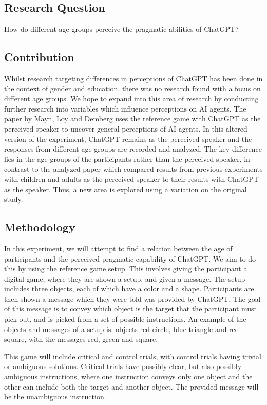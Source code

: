 \documentclass[12pt]{article}
\begin{document}
\subsection{Research Question}
How do different age groups perceive the pragmatic abilities of ChatGPT?


\subsection{Contribution}
Whilst research targeting differences in perceptions of ChatGPT has been done in the context of gender and education, there was no research found with a focus on different age groups. We hope to expand into this area of research by conducting further research into variables which influence perceptions on AI agents. 
The paper by Mayn, Loy and Demberg uses the reference game with ChatGPT as the perceived speaker to uncover general perceptions of AI agents. In this altered version of the experiment, ChatGPT remains as the perceived speaker and the responses from different age groups are recorded and analyzed. The key difference lies in the age groups of the participants rather than the perceived speaker, in contrast to the analyzed paper which compared results from previous experiments with children and adults as the perceived speaker to their results with ChatGPT as the speaker. Thus, a new area is explored using a variation on the original study.


\subsection{Methodology}

In this experiment, we will attempt to find a relation between the age of participants and the perceived pragmatic capability of ChatGPT. We aim to do this by using the reference game setup. This involves giving the participant a digital game, where they are shown a setup, and given a message. The setup includes three objects, each of which have a color and a shape. Participants are then shown a message which they were told was provided by ChatGPT. The goal of this message is to convey which object is the target that the participant must pick out, and is picked from a set of possible instructions. An example of the objects and messages of a setup is: objects red circle, blue triangle and red square, with the messages red, green and square. 

This game will include critical and control trials, with control trials having trivial or ambiguous solutions. Critical trials have possibly clear, but also possibly ambiguous instructions, where one instruction conveys only one object and the other can include both the target and another object. The provided message will be the unambiguous instruction.
\end{document}
